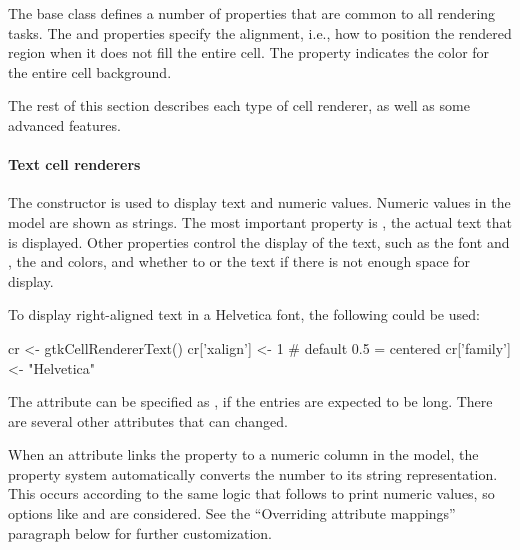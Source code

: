 
The base class  defines a number of properties
that are common to all rendering tasks. The  and
 properties specify the alignment, i.e., how to position
the rendered region when it does not fill the entire cell. The
 property indicates the color for the entire
cell background.

The rest of this section describes each type of cell renderer, as well
as some advanced features.

\paragraph{Text cell renderers}

The  constructor is used to display
text and numeric values. Numeric values in the model are shown as
strings.  The most important property is , the actual text
that is displayed. Other properties control the display of the text,
such as the font  and , the 
and  colors, and whether to  or
 the text if there is not enough space for display.

To display right-aligned text in a Helvetica font, the following could be used:
\begin{Schunk}
\begin{Sinput}
 cr <- gtkCellRendererText()
 cr['xalign'] <- 1                    # default 0.5 = centered
 cr['family'] <- "Helvetica"  
\end{Sinput}
\end{Schunk}

The  attribute can be specified as , if the
entries are expected to be long. There are several other attributes that can
changed. 

When an attribute links the  property to a numeric column
in the model, the property system automatically converts the number to
its string representation. This occurs according to the same logic
that \R\/ follows to print numeric values, so options like
 and  are considered. See the ``Overriding
attribute mappings'' paragraph below for further customization.


